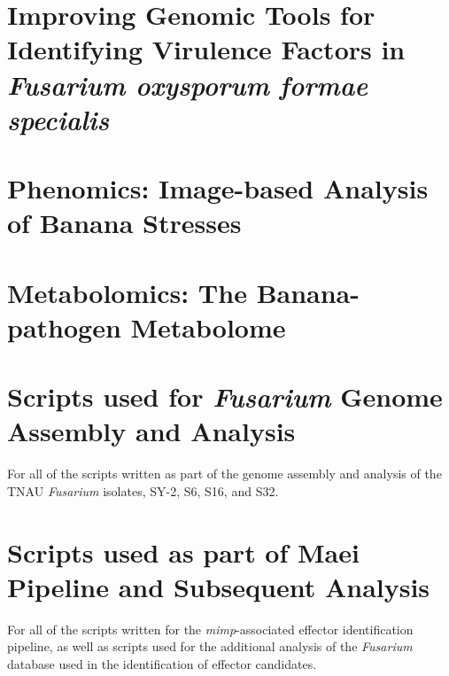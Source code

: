 \documentclass[11pt,a4paper]{report}
\begin{document}
\chapter{Improving Genomic Tools for Identifying Virulence Factors in \textit{Fusarium oxysporum formae specialis}}
 
\chapter{Phenomics: Image-based Analysis of Banana Stresses}
 
 \chapter{Metabolomics: The Banana-pathogen Metabolome}
 


\appendix                            %
\chapter{Scripts used for \textit{Fusarium} Genome Assembly and Analysis}
For all of the scripts written as part of the genome assembly and analysis of the TNAU \textit{Fusarium} isolates, SY-2, S6, S16, and S32. 


\chapter{Scripts used as part of Maei Pipeline and Subsequent Analysis}
For all of the scripts written for the \textit{mimp}-associated effector identification pipeline, as well as scripts used for the additional analysis of the \textit{Fusarium} database used in the identification of effector candidates. 


%


\end{document}
